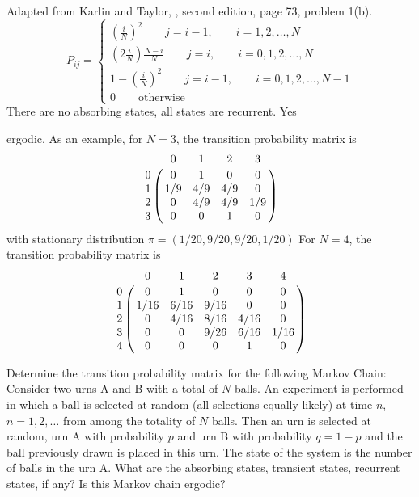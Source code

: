 \documentclass[12pt]{article}
\begin{document}
\begin{solution}
    Adapted from Karlin and Taylor, , second edition, page 73, problem 1(b).
    \[
        P_{ij} =
        \begin{cases}
            (\frac{i}{N})^2 \qquad j = i-1, \qquad i=1,2,\dots,N \\
            (2\frac{i}{N})\frac{N-i}{N} \qquad j = i, \qquad i=0,1,2,\dots,N
            \\
            1- (\frac{i}{N})^2 \qquad j = i-1, \qquad i=0,1,2,\dots,N-1
            \\
            0 \qquad \text{otherwise}
        \end{cases}
    \] There are no absorbing states, all states are recurrent.  Yes

    ergodic. As an example, for \( N = 3 \), the transition probability
    matrix is
    \[
        \bordermatrix{ & 0 & 1 & 2 & 3 \cr
        0 & 0 & 1 & 0 & 0 \cr
        1 & 1/9 & 4/9 & 4/9 & 0 \cr
        2 & 0 & 4/9 & 4/9 & 1/9 \cr
        3 & 0 & 0 & 1 & 0 }
    \] with stationary distribution \( \pi = (1/20, 9/20, 9/20, 1/20) \)
    For \( N = 4 \), the transition probability matrix is
    \[
        \bordermatrix{ & 0 & 1 & 2 & 3 & 4 \cr
        0 & 0 & 1 & 0 & 0 & 0 \cr
        1 & 1/16& 6/16& 9/16& 0 & 0 \cr
        2 & 0 & 4/16& 8/16& 4/16 & 0 \cr
        3 & 0 & 0 & 9/26& 6/16 & 1/16 \cr
        4 & 0 & 0 & 0 & 1 & 0 }
    \]
\end{solution}
\begin{exercise}
    Determine the transition probability matrix for the following Markov
    Chain:  Consider two urns A and B with a total of \( N \) balls.  An
    experiment is performed in which a ball is selected at random (all
    selections equally likely) at time \( n \), \( n=1,2,\dots \) from
    among the totality of \( N \) balls.  Then an urn is selected at
    random, urn A with probability \( p \) and urn B with probability \(
    q = 1- p \) and the ball previously drawn is placed in this urn.
    The state of the system is the number of balls in the urn A. What
    are the absorbing states, transient states, recurrent states, if
    any?  Is this Markov chain ergodic?
\end{exercise}
\end{document}
